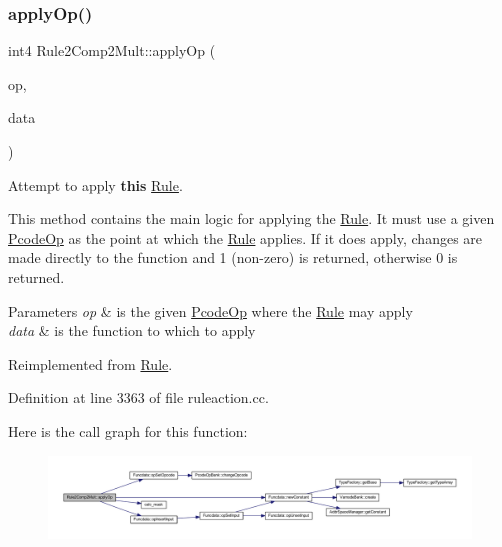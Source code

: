 \subsubsection{\texorpdfstring{applyOp()}{applyOp()}}
{\footnotesize\ttfamily int4 Rule2\+Comp2\+Mult\+::apply\+Op (\begin{DoxyParamCaption}\item[{\mbox{\hyperlink{class_pcode_op}{Pcode\+Op}} $\ast$}]{op,  }\item[{\mbox{\hyperlink{class_funcdata}{Funcdata}} \&}]{data }\end{DoxyParamCaption})\hspace{0.3cm}{\ttfamily [virtual]}}



Attempt to apply {\bfseries{this}} \mbox{\hyperlink{class_rule}{Rule}}. 

This method contains the main logic for applying the \mbox{\hyperlink{class_rule}{Rule}}. It must use a given \mbox{\hyperlink{class_pcode_op}{Pcode\+Op}} as the point at which the \mbox{\hyperlink{class_rule}{Rule}} applies. If it does apply, changes are made directly to the function and 1 (non-\/zero) is returned, otherwise 0 is returned. 
\begin{DoxyParams}{Parameters}
{\em op} & is the given \mbox{\hyperlink{class_pcode_op}{Pcode\+Op}} where the \mbox{\hyperlink{class_rule}{Rule}} may apply \\
\hline
{\em data} & is the function to which to apply \\
\hline
\end{DoxyParams}


Reimplemented from \mbox{\hyperlink{class_rule_a4e3e61f066670175009f60fb9dc60848}{Rule}}.



Definition at line 3363 of file ruleaction.\+cc.

Here is the call graph for this function\+:
\nopagebreak
\begin{figure}[H]
\begin{center}
\leavevmode
\includegraphics[width=350pt]{class_rule2_comp2_mult_a1a526d775f62b172a92886444b5889a3_cgraph}
\end{center}
\end{figure}
\mbox{\label{class_rule2_comp2_mult_a6aff1bc6cd4214605512eb99150f09d5}} 
